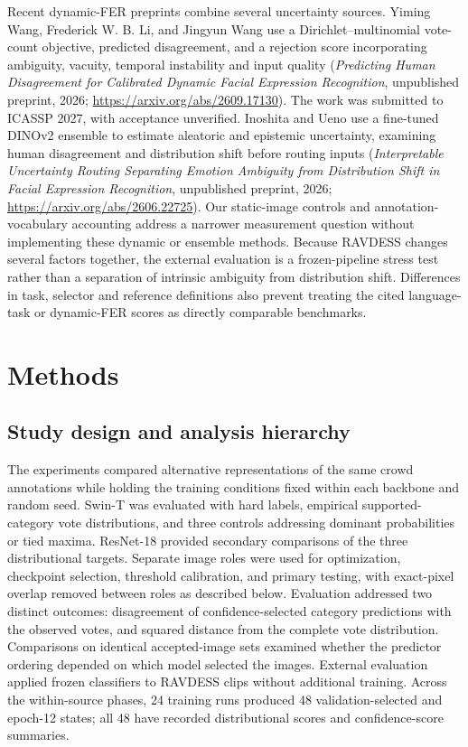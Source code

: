 \documentclass[pdflatex,sn-mathphys-num]{sn-jnl}
\begin{document}
Recent dynamic-FER preprints combine several uncertainty sources. Yiming Wang, Frederick W. B. Li, and Jingyun Wang use a Dirichlet--multinomial vote-count objective, predicted disagreement, and a rejection score incorporating ambiguity, vacuity, temporal instability and input quality (\emph{Predicting Human Disagreement for Calibrated Dynamic Facial Expression Recognition}, unpublished preprint, 2026; \url{https://arxiv.org/abs/2609.17130}). The work was submitted to ICASSP 2027, with acceptance unverified. Inoshita and Ueno use a fine-tuned DINOv2 ensemble to estimate aleatoric and epistemic uncertainty, examining human disagreement and distribution shift before routing inputs (\emph{Interpretable Uncertainty Routing Separating Emotion Ambiguity from Distribution Shift in Facial Expression Recognition}, unpublished preprint, 2026; \url{https://arxiv.org/abs/2606.22725}). Our static-image controls and annotation-vocabulary accounting address a narrower measurement question without implementing these dynamic or ensemble methods. Because RAVDESS changes several factors together, the external evaluation is a frozen-pipeline stress test rather than a separation of intrinsic ambiguity from distribution shift. Differences in task, selector and reference definitions also prevent treating the cited language-task or dynamic-FER scores as directly comparable benchmarks.

\section{Methods}
\subsection{Study design and analysis hierarchy}
The experiments compared alternative representations of the same crowd annotations while holding the training conditions fixed within each backbone and random seed. Swin-T was evaluated with hard labels, empirical supported-category vote distributions, and three controls addressing dominant probabilities or tied maxima. ResNet-18 provided secondary comparisons of the three distributional targets. Separate image roles were used for optimization, checkpoint selection, threshold calibration, and primary testing, with exact-pixel overlap removed between roles as described below. Evaluation addressed two distinct outcomes: disagreement of confidence-selected category predictions with the observed votes, and squared distance from the complete vote distribution. Comparisons on identical accepted-image sets examined whether the predictor ordering depended on which model selected the images. External evaluation applied frozen classifiers to RAVDESS clips without additional training. Across the within-source phases, 24 training runs produced 48 validation-selected and epoch-12 states; all 48 have recorded distributional scores and confidence-score summaries.
\end{document}
